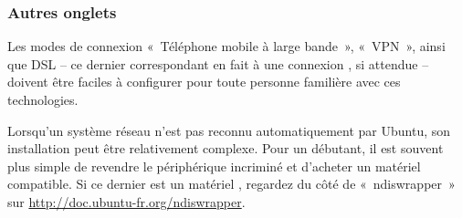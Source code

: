 \subsubsection{Autres onglets}
Les modes de connexion «~Téléphone mobile à large bande~», «~VPN~», ainsi que DSL -- ce dernier correspondant en fait à une connexion , si attendue -- doivent être faciles à configurer pour toute personne familière avec ces technologies.
\begin{nota}
\label{RefNoteDongleWifi}
Lorsqu'un système réseau n'est pas reconnu automatiquement par Ubuntu, son installation peut être relativement complexe. Pour un débutant, il est souvent plus simple de revendre le périphérique incriminé et d'acheter un matériel compatible. Si ce dernier est un matériel , regardez du côté de «~ndiswrapper~» sur \url{http://doc.ubuntu-fr.org/ndiswrapper}.
\end{nota}

